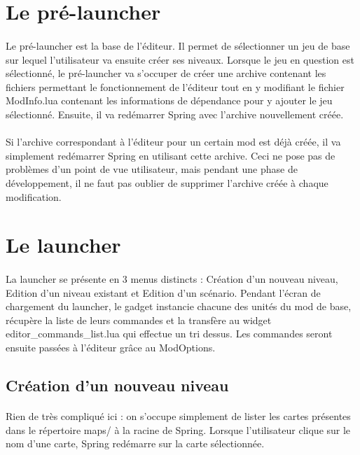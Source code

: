 \documentclass[a4paper]{article}
\begin{document}
\section{Le pré-launcher}
\paragraph{}
Le pré-launcher est la base de l'éditeur. Il permet de sélectionner un jeu de base sur lequel l'utilisateur va ensuite créer ses niveaux. Lorsque le jeu en question est sélectionné, le pré-launcher va s'occuper de créer une archive contenant les fichiers permettant le fonctionnement de l'éditeur tout en y modifiant le fichier ModInfo.lua contenant les informations de dépendance pour y ajouter le jeu sélectionné. Ensuite, il va redémarrer Spring avec l'archive nouvellement créée.
\paragraph{}
Si l'archive correspondant à l'éditeur pour un certain mod est déjà créée, il va simplement redémarrer Spring en utilisant cette archive. Ceci ne pose pas de problèmes d'un point de vue utilisateur, mais pendant une phase de développement, il ne faut pas oublier de supprimer l'archive créée à chaque modification.
\section{Le launcher}
\paragraph{}
La launcher se présente en 3 menus distincts : Création d'un nouveau niveau, Edition d'un niveau existant et Edition d'un scénario. Pendant l'écran de chargement du launcher, le gadget instancie chacune des unités du mod de base, récupère la liste de leurs commandes et la transfère au widget editor\_commands\_list.lua qui effectue un tri dessus. Les commandes seront ensuite passées à l'éditeur grâce au ModOptions.
\subsection{Création d'un nouveau niveau}
\paragraph{}
Rien de très compliqué ici : on s'occupe simplement de lister les cartes présentes dans le répertoire maps/ à la racine de Spring. Lorsque l'utilisateur clique sur le nom d'une carte, Spring redémarre sur la carte sélectionnée.
\end{document}
